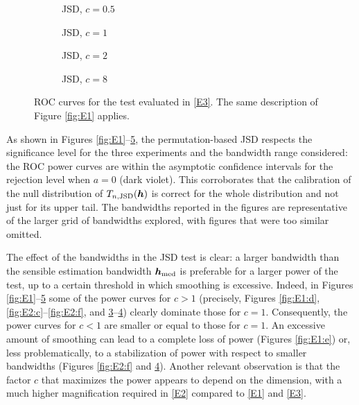 \documentclass[oneside,11pt]{article}
\begin{document}
\begin{figure}[htpb!]
    \centering
    \begin{subfigure}{0.25\textwidth}
        \centering
        \caption{\small JSD, $c=0.5$} \label{fig:E3:a}
    \end{subfigure}%
    \begin{subfigure}{0.25\textwidth}
        \centering
        \caption{\small JSD, $c=1$} \label{fig:E3:b}
    \end{subfigure}%
        \begin{subfigure}{0.25\textwidth}
        \centering
        \caption{\small JSD, $c=2$} \label{fig:E3:c}
    \end{subfigure}%
        \begin{subfigure}{0.25\textwidth}
        \centering
        \caption{\small JSD, $c=8$} \label{fig:E3:d}
    \end{subfigure}
    \caption{\small ROC curves for the test evaluated in \ref{E3}. The same description of Figure \ref{fig:E1} applies.}
    \label{fig:E3}
\end{figure}

As shown in Figures \ref{fig:E1}--\ref{fig:E3}, the permutation-based JSD respects the significance level for the three experiments and the bandwidth range considered: the ROC power curves are within the asymptotic confidence intervals for the rejection level when $a=0$ (dark violet). This corroborates that the calibration of the null distribution of $T_{n,\mathrm{JSD}}({\boldsymbol{h}})$ is correct for the whole distribution and not just for its upper tail. The bandwidths reported in the figures are representative of the larger grid of bandwidths explored, with figures that were too similar omitted.

The effect of the bandwidths in the JSD test is clear: a larger bandwidth than the sensible estimation bandwidth ${\boldsymbol{h}}_\mathrm{med}$ is preferable for a larger power of the test, up to a certain threshold in which smoothing is excessive. Indeed, in Figures \ref{fig:E1}--\ref{fig:E3} some of the power curves for $c>1$ (precisely, Figures \ref{fig:E1:d}, \ref{fig:E2:c}--\ref{fig:E2:f}, and \ref{fig:E3:c}--\ref{fig:E3:d}) clearly dominate those for $c=1$. Consequently, the power curves for $c<1$ are smaller or equal to those for $c=1$. An excessive amount of smoothing can lead to a complete loss of power (Figures \ref{fig:E1:e}) or, less problematically, to a stabilization of power with respect to smaller bandwidths (Figures \ref{fig:E2:f} and \ref{fig:E3:d}). Another relevant observation is that the factor $c$ that maximizes the power appears to depend on the dimension, with a much higher magnification required in \ref{E2} compared to \ref{E1} and \ref{E3}.
\end{document}
